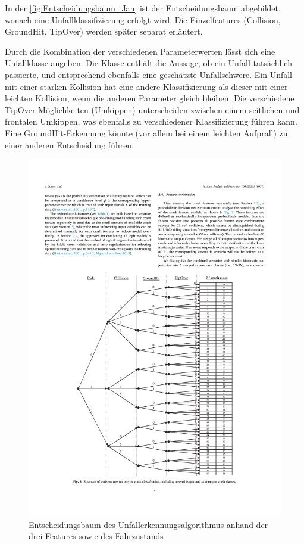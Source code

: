 In der \autoref{fig:Entscheidungsbaum_Jan} ist der Entscheidungsbaum abgebildet, wonach eine Unfallklassifizierung erfolgt wird. Die Einzelfeatures (Collision, GroundHit, TipOver) werden später separat erläutert.

Durch die Kombination der verschiedenen Parameterwerten lässt sich eine Unfallklasse angeben. Die Klasse enthält die Aussage, ob ein Unfall tatsächlich passierte, und entsprechend ebenfalls eine geschätzte Unfallschwere.
Ein Unfall mit einer starken Kollision hat eine andere Klassifizierung als dieser mit einer leichten Kollision, wenn die anderen Parameter gleich bleiben.
Die verschiedene TipOver-Möglichkeiten (Umkippen) unterscheiden zwischen einem seitlichen und frontalen Umkippen, was ebenfalls zu verschiedener Klassifizierung führen kann.
Eine GroundHit-Erkennung könnte (vor allem bei einem leichten Aufprall) zu einer anderen Entscheidung führen.
\begin{figure}
	\centering
	\includegraphics[width=\linewidth]{Bilder/Entscheidungsbaum_Jan_pdf.pdf}
	\caption{Entscheidungsbaum des Unfallerkennungsalgorithmus anhand der drei Features sowie des Fahrzustands\citep{Schneeclassification2021}}
	\label{fig:Entscheidungsbaum_Jan}
\end{figure}


